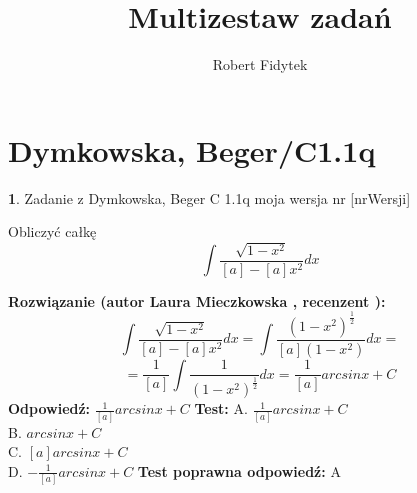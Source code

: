 \documentclass[12pt, a4paper]{article}
\title{Multizestaw zadań}
\author{Robert Fidytek}
\date{}
\theoremstyle{definition} %
\newtheorem{zad}{}
\newcommand{\kategoria}[1]{\section{#1}} %
\newcommand{\zadStart}[1]{\begin{zad}#1\newline} %
\newcommand{\zadStop}{\end{zad}}   %
\newcommand{\rozwStart}[2]{\noindent \textbf{Rozwiązanie (autor #1 , recenzent #2): }\newline} %
\newcommand{\rozwStop}{\newline}                                            %
\newcommand{\odpStart}{\noindent \textbf{Odpowiedź:}\newline}    %
\newcommand{\odpStop}{\newline}                                             %
\newcommand{\testStart}{\noindent \textbf{Test:}\newline} %
\newcommand{\testStop}{\newline} %
\newcommand{\kluczStart}{\noindent \textbf{Test poprawna odpowiedź:}\newline} %
\newcommand{\kluczStop}{\newline} %
\begin{document}
\maketitle


\kategoria{Dymkowska, Beger/C1.1q}
\zadStart{Zadanie z Dymkowska, Beger C 1.1q  moja wersja nr [nrWersji]}


Obliczyć całkę $$\int \frac{\sqrt{1-x^2}}{[a]-[a]x^2}dx$$
\zadStop
\rozwStart{Laura Mieczkowska}{}
$$\int \frac{\sqrt{1-x^2}}{[a]-[a]x^2}dx=\int \frac{(1-x^2)^{\frac{1}{2}}}{[a](1-x^2)}dx=$$
$$=\frac{1}{[a]}\int\frac{1}{(1-x^2)^{\frac{1}{2}}}dx=\frac{1}{[a]}arcsinx+C$$
\rozwStop
\odpStart
$\frac{1}{[a]}arcsinx+C$
\odpStop
\testStart
A. $\frac{1}{[a]}arcsinx+C$ \\
B. $arcsinx+C$ \\
C. $[a]arcsinx+C$ \\
D. $-\frac{1}{[a]}arcsinx+C$
\testStop
\kluczStart
A
\kluczStop
\end{document}
